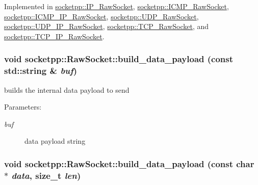 Implemented in \hyperlink{classsocketpp_1_1IP__RawSocket_c39832f1ad83184cd5ba94c4c967f465}{socketpp::IP\_\-RawSocket}, \hyperlink{classsocketpp_1_1ICMP__RawSocket_e183b11c080f5d74dbc386ec53e7feb5}{socketpp::ICMP\_\-RawSocket}, \hyperlink{classsocketpp_1_1ICMP__IP__RawSocket_6d2f188d46030afa13f9c3971d43d518}{socketpp::ICMP\_\-IP\_\-RawSocket}, \hyperlink{classsocketpp_1_1UDP__RawSocket_a2dd7ab190a6730f9272eced4e648b50}{socketpp::UDP\_\-RawSocket}, \hyperlink{classsocketpp_1_1UDP__IP__RawSocket_40fde867fa138b495f660864023a3eb1}{socketpp::UDP\_\-IP\_\-RawSocket}, \hyperlink{classsocketpp_1_1TCP__RawSocket_6976a4726503eef03a8d446afdbaddbe}{socketpp::TCP\_\-RawSocket}, and \hyperlink{classsocketpp_1_1TCP__IP__RawSocket_f8f606ce33835813cc5c3a530e181432}{socketpp::TCP\_\-IP\_\-RawSocket}.\hypertarget{classsocketpp_1_1RawSocket_a5e01f4dec94dbbef1c122ce4d7ed4ad}{
\subsubsection[{build\_\-data\_\-payload}]{\setlength{\rightskip}{0pt plus 5cm}void socketpp::RawSocket::build\_\-data\_\-payload (const std::string \& {\em buf})}}
\label{classsocketpp_1_1RawSocket_a5e01f4dec94dbbef1c122ce4d7ed4ad}


builds the internal data payload to send 

\begin{Desc}
\item[Parameters:]
\begin{description}
\item[{\em buf}]data payload string \end{description}
\end{Desc}
\hypertarget{classsocketpp_1_1RawSocket_99ea2415525269d24ba088a58d62abdd}{
\subsubsection[{build\_\-data\_\-payload}]{\setlength{\rightskip}{0pt plus 5cm}void socketpp::RawSocket::build\_\-data\_\-payload (const char $\ast$ {\em data}, \/  size\_\-t {\em len})}}
\label{classsocketpp_1_1RawSocket_99ea2415525269d24ba088a58d62abdd}


